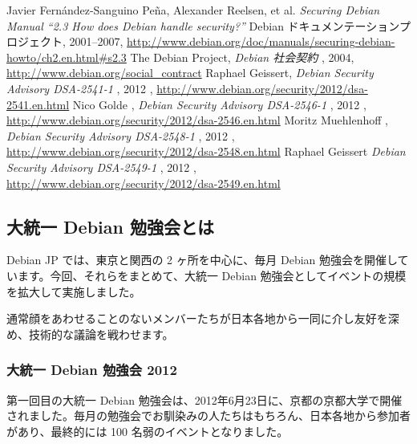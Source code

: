\documentclass[mingoth,a4paper]{jsarticle}
\begin{document}
\begin{thebibliography}{99}
Javier Fern\'{a}ndez-Sanguino Pe\~{n}a, Alexander Reelsen, et al.
 {\em Securing Debian Manual ``2.3 How does Debian handle security?''}
 Debian ドキュメンテーションプロジェクト,
 2001--2007,
\url{http://www.debian.org/doc/manuals/securing-debian-howto/ch2.en.html#s2.3}
        The Debian Project, {\em Debian 社会契約} ,
         2004,
            \url{http://www.debian.org/social_contract}
   Raphael Geissert,
 {\em Debian Security Advisory DSA-2541-1}
 , 2012
 , \url{http://www.debian.org/security/2012/dsa-2541.en.html}
   Nico Golde ,
 {\em Debian Security Advisory DSA-2546-1}
 , 2012
 , \url{http://www.debian.org/security/2012/dsa-2546.en.html}
   Moritz Muehlenhoff ,
 {\em Debian Security Advisory DSA-2548-1}
 , 2012
 , \url{http://www.debian.org/security/2012/dsa-2548.en.html}
   Raphael Geissert
 {\em Debian Security Advisory DSA-2549-1}
 , 2012
 , \url{http://www.debian.org/security/2012/dsa-2549.en.html}
\end{thebibliography}

\clearpage


\label{sec:gumreportsummary}

\subsection{大統一 Debian 勉強会とは}

Debian JP では、東京と関西の 2 ヶ所を中心に、毎月 Debian 勉強会を開催しています。今回、それらをまとめて、大統一 Debian 勉強会としてイベントの規模を拡大して実施しました。

通常顔をあわせることのないメンバーたちが日本各地から一同に介し友好を深め、技術的な議論を戦わせます。

\subsubsection{大統一 Debian 勉強会 2012}

第一回目の大統一 Debian 勉強会は、2012年6月23日に、京都の京都大学で開催されました。毎月の勉強会でお馴染みの人たちはもちろん、日本各地から参加者があり、最終的には 100 名弱のイベントとなりました。
\end{document}
